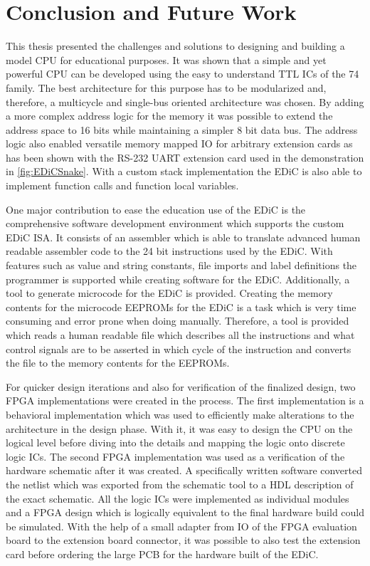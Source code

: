 
\chapter{Conclusion and Future Work}\label{cha:conclusion}
This thesis presented the challenges and solutions to designing and building a model \gls{CPU} for educational purposes.
It was shown that a simple and yet powerful \gls{CPU} can be developed using the easy to understand \gls{TTL} \glspl{IC} of the 74 family.
The best architecture for this purpose has to be modularized and, therefore, a multicycle and single-bus oriented architecture was chosen.
By adding a more complex address logic for the memory it was possible to extend the address space to 16 bits while maintaining a simpler 8 bit data bus.
The address logic also enabled versatile memory mapped \gls{IO} for arbitrary extension cards as has been shown with the RS-232 \gls{UART} extension card used in the demonstration in \cref{fig:EDiCSnake}.
With a custom stack implementation the \gls{EDiC} is also able to implement function calls and function local variables.

One major contribution to ease the education use of the \gls{EDiC} is the comprehensive software development environment which supports the custom \gls{EDiC} \gls{ISA}.
It consists of an assembler which is able to translate advanced human readable assembler code to the 24 bit instructions used by the \gls{EDiC}.
With features such as value and string constants, file imports and label definitions the programmer is supported while creating software for the \gls{EDiC}.
Additionally, a tool to generate microcode for the \gls{EDiC} is provided.
Creating the memory contents for the microcode \glspl{EEPROM} for the \gls{EDiC} is a task which is very time consuming and error prone when doing manually.
Therefore, a tool is provided which reads a human readable file which describes all the instructions and what control signals are to be asserted in which cycle of the instruction and converts the file to the memory contents for the \glspl{EEPROM}.

For quicker design iterations and also for verification of the finalized design, two \gls{FPGA} implementations were created in the process.
The first implementation is a behavioral implementation which was used to efficiently make alterations to the architecture in the design phase.
With it, it was easy to design the \gls{CPU} on the logical level before diving into the details and mapping the logic onto discrete logic \glspl{IC}.
The second \gls{FPGA} implementation was used as a verification of the hardware schematic after it was created.
A specifically written software converted the netlist which was exported from the schematic tool to a \gls{HDL} description of the exact schematic.
All the logic \glspl{IC} were implemented as individual modules and a \gls{FPGA} design which is logically equivalent to the final hardware build could be simulated.
With the help of a small adapter from \gls{IO} of the \gls{FPGA} evaluation board to the extension board connector, it was possible to also test the extension card before ordering the large \gls{PCB} for the hardware built of the \gls{EDiC}.

